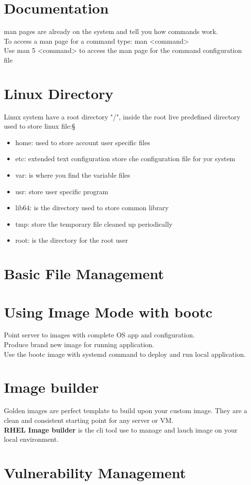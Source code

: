 \documentclass[12pt, letterpaper, twoside]{article}
\begin{document}
\section{Documentation}
man pages are already on the system and tell you how commands work.\\
To access a man page for a command type: man <command>\\
Use man 5 <command> to access the man page for the command configuration file

\section{Linux Directory}
Linux system have a root directory "/", inside the root live predefined directory used to store linux file:§
\begin{itemize}
	\item home: used to store account user specific files 
	\item etc: extended text configuration store che configuration file for yor system
	\item var: is where you find the variable files
	\item usr: store user specific program
	\item lib64: is the directory used to store common library
	\item tmp: store the temporary file cleaned up periodically
	\item root: is the directory for the root user
\end{itemize}

\section{Basic File Management}

\section{Using Image Mode with bootc}
Point server to images with complete OS app and configuration.\\
Produce brand new image for running application.\\
Use the bootc image with systemd command to deploy and run local application.\\

\section{Image builder}
Golden images are perfect template to build upon your custom image. They are a clean and 
consistent starting point for any server or VM.\\
\textbf{RHEL Image builder} is the cli tool use to manage and lauch image on your local environment.\\

\section{Vulnerability Management}
\printindex
\end{document}
